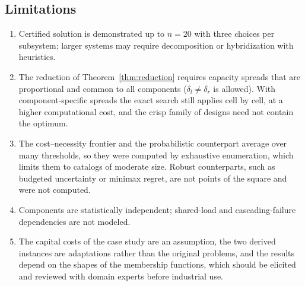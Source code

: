 \documentclass[Review,sagev,times]{sagej}%
\begin{document}
\subsection{Limitations} \label{sec:limitations}
\begin{enumerate}
\item Certified solution is demonstrated up to $n=20$ with three choices per subsystem; larger systems may require
decomposition or hybridization with heuristics.
\item The reduction of Theorem~\ref{thm:reduction} requires capacity spreads that are proportional and common to
all components ($\delta_l\ne\delta_r$ is allowed). With component-specific spreads the exact search still
applies cell by cell, at a higher computational cost, and the crisp family of designs need not contain the
optimum.
\item The cost--necessity frontier and the probabilistic counterpart average over many thresholds, so they were
computed by exhaustive enumeration, which limits them to catalogs of moderate size. Robust counterparts, such as
budgeted uncertainty\cite{BertsimasSim2004} or minimax regret\cite{FeizollahiModarres2012}, are not points of the
square and were not computed.
\item Components are statistically independent; shared-load and cascading-failure dependencies\cite{WU2025110678}
are not modeled.
\item The capital costs of the case study are an assumption, the two derived instances are adaptations rather
than the original problems, and the results depend on the shapes of the membership functions, which should be
elicited and reviewed with domain experts before industrial use.
\end{enumerate}
\end{document}
